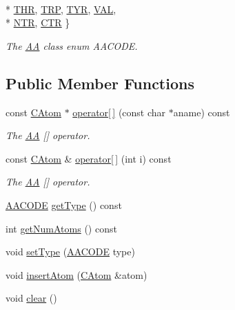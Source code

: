 \begin{DoxyCompactItemize}
\\*
\hyperlink{classAA_a8717db02e7eeaac316898736843fa600ad7c137e98cba8533a976dc060ed47580}{T\-H\-R}, 
\hyperlink{classAA_a8717db02e7eeaac316898736843fa600a80f39d69089385967584e0d860abf8c8}{T\-R\-P}, 
\hyperlink{classAA_a8717db02e7eeaac316898736843fa600a14daa08339ebd75d5856d9e99325a7eb}{T\-Y\-R}, 
\hyperlink{classAA_a8717db02e7eeaac316898736843fa600ac22cf3896ad17e3136d9ed2f403e31f9}{V\-A\-L}, 
\\*
\hyperlink{classAA_a8717db02e7eeaac316898736843fa600a2362193b9e548fbc61b1b502e539f176}{N\-T\-R}, 
\hyperlink{classAA_a8717db02e7eeaac316898736843fa600a67989ca37e3ee8b892f7569ca60a9bbd}{C\-T\-R}
 \}
\begin{DoxyCompactList}\small\item\em The \hyperlink{classAA}{A\-A} class enum A\-A\-C\-O\-D\-E. \end{DoxyCompactList}\end{DoxyCompactItemize}
\subsection*{Public Member Functions}
\begin{DoxyCompactItemize}
\item 
const \hyperlink{classCAtom}{C\-Atom} $\ast$ \hyperlink{classAA_aa271a8269c3a69c795651b87768abd3c}{operator\mbox{[}$\,$\mbox{]}} (const char $\ast$aname) const 
\begin{DoxyCompactList}\small\item\em The \hyperlink{classAA}{A\-A} \mbox{[}\mbox{]} operator. \end{DoxyCompactList}\item 
const \hyperlink{classCAtom}{C\-Atom} \& \hyperlink{classAA_ad47e1014c42578100eb951d057130d60}{operator\mbox{[}$\,$\mbox{]}} (int i) const 
\begin{DoxyCompactList}\small\item\em The \hyperlink{classAA}{A\-A} \mbox{[}\mbox{]} operator. \end{DoxyCompactList}\item 
\hyperlink{classAA_a8717db02e7eeaac316898736843fa600}{A\-A\-C\-O\-D\-E} \hyperlink{classAA_a7bb2b102b435f41fa3c78c1cded8ce93}{get\-Type} () const 
\item 
int \hyperlink{classAA_a296b621ecb2dc785e0c27614dab7df37}{get\-Num\-Atoms} () const 
\item 
void \hyperlink{classAA_a111b14b73321f7fbd0e910fe7377d3e2}{set\-Type} (\hyperlink{classAA_a8717db02e7eeaac316898736843fa600}{A\-A\-C\-O\-D\-E} type)
\item 
void \hyperlink{classAA_ae0851c13f0b0aee431c4b90a17a58c7a}{insert\-Atom} (\hyperlink{classCAtom}{C\-Atom} \&atom)
\item 
void \hyperlink{classAA_a77290c917ac630708465bb700c9a1d91}{clear} ()
\end{DoxyCompactItemize}
